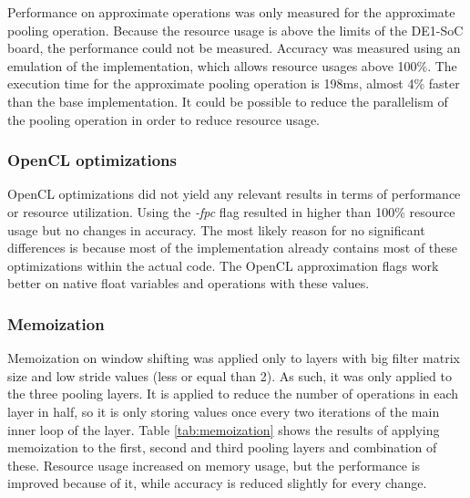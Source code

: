 \begin{enumerate}
Performance on approximate operations was only measured for the approximate
pooling operation. Because the resource usage is above the limits of the DE1-SoC board,
the performance could not be measured. Accuracy was measured using an emulation of the
implementation, which allows resource usages above 100\%. The execution time for
the approximate pooling operation is 198ms, almost 4\% faster than the base implementation.
It could be possible to reduce the parallelism of the pooling operation in order to reduce resource
usage.

\subsubsection{OpenCL optimizations}

OpenCL optimizations did not yield any relevant results in terms of performance or
resource utilization. Using the \textit{-fpc} flag resulted in higher than 100\% resource
usage but no changes in accuracy. The most likely reason for no significant differences
is because most of the implementation already contains most of these optimizations within
the actual code. The OpenCL approximation flags work better on native float variables
and operations with these values.

\subsubsection{Memoization}

Memoization on window shifting was applied only to layers with big filter matrix size and low
stride values (less or equal than 2). As such, it was only applied to the three pooling layers.
It is applied to reduce the number of operations in each layer in half, so it is only storing
values once every two iterations of the main inner loop of the layer.
Table \ref{tab:memoization} shows the results of applying memoization to the first, second and third
pooling layers and combination of these. Resource usage increased on memory usage, but the performance
is improved because of it, while accuracy is reduced slightly for every change.


\end{enumerate}
